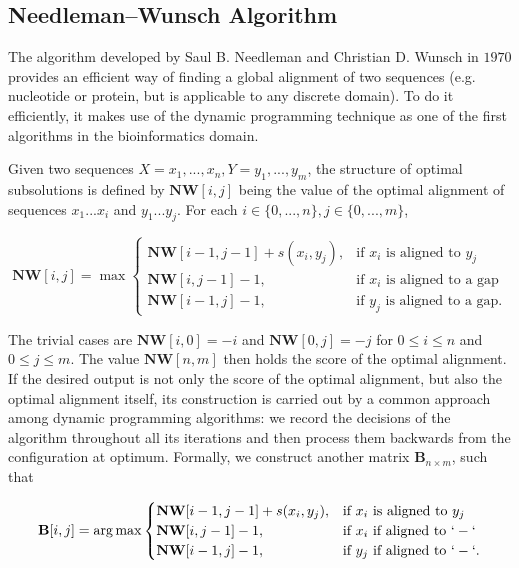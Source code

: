 \subsection*{Needleman–Wunsch Algorithm}
The algorithm developed by Saul B. Needleman and Christian D. Wunsch in $1970$ \cite{NeedlemanWunsch} provides an efficient way of finding a global alignment of two sequences (e.g. nucleotide or protein, but is applicable to any discrete domain). To do it efficiently, it makes use of the dynamic programming technique as one of the first algorithms in the bioinformatics domain.

Given two sequences $X = x_1,...,x_n, Y = y_1,...,y_m$, the structure of optimal subsolutions is defined by $\textbf{NW}[i, j]$ being the value of the optimal alignment of sequences $x_1...x_i$ and $y_1...y_j$. For each $i \in \{0, ..., n\}, j \in \{0, ..., m\}$,

\begin{equation}
\textbf{NW}[i, j] = \max
\begin{cases} 
    \textbf{NW}[i - 1, j - 1] + s(x_i, y_j), & \text{if } x_i \text{ is aligned to } y_j\\
    \textbf{NW}[i, j - 1] - 1, & \text{if } x_i \text{ is aligned to a gap}\\
    \textbf{NW}[i - 1, j] - 1, & \text{if } y_j \text{ is aligned to a gap}.
\end{cases}
\end{equation}


The trivial cases are $\textbf{NW}[i, 0] = -i$ and $\textbf{NW}[0, j] = -j$ for  $0 \leq i \leq n$ and $0 \leq j \leq m$. The value $\textbf{NW}[n, m]$ then holds the score of the optimal alignment. If the desired output is not only the score of the optimal alignment, but also the optimal alignment itself, its construction is carried out by a common approach among dynamic programming algorithms: we record the decisions of the algorithm throughout all its iterations and then process them backwards from the configuration at optimum. Formally, we construct another matrix $\textbf{B}_{n \times m}$, such that

\begin{equation}
\textbf{B}[i, j] = \arg \max
\begin{cases} 
    \textbf{NW}[i - 1, j - 1] + s(x_i, y_j), & \text{if } x_i \text{ is aligned to } y_j\\
    \textbf{NW}[i, j - 1] - 1, & \text{if } x_i \text{ if aligned to } `-`\\
    \textbf{NW}[i - 1, j] - 1, & \text{if } y_j \text{ if aligned to } `-`.
\end{cases}
\end{equation}

